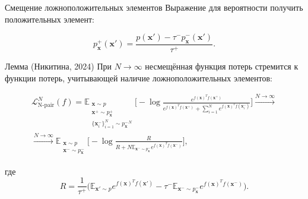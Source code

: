 \documentclass{beamer}
\begin{document}
\begin{frame}{Смещение ложноположительных элементов}
\small
Выражение для вероятности получить положительных элемент:

\[p_\mathbf{x}^+ (\textbf{x}') = \frac{p(\textbf{x}') - \tau^- p^-_\mathbf{x}(\textbf{x}')}{\tau^+}.\]

\begin{block}{Лемма (Никитина, 2024)}
При $N \to \infty$ несмещённая функция потерь стремится к функции потерь, учитывающей наличие ложноположительных элементов:
\end{block}
\begin{equation*}
\begin{split}
\mathcal{L}_{\text{N-pair}}^N(f) = \mathbb{E}_{\substack{\mathbf{x} \sim p \\ \mathbf{x}^+ \sim p_\mathbf{x}^+ \\ \{\mathbf{x}_i^-\}_{i=1}^N \sim {p_\mathbf{x}^-}^N}} \bigg[ - \log \frac{e^{f(\mathbf{x})^T f(\mathbf{x}^+)}}{e^{f(\mathbf{x})^T f(\mathbf{x}^+)} + \sum_{i=1}^N e^{f(\mathbf{x})^T f(\mathbf{x}_i^-)}} \bigg] \overset{N \to \infty}{\longrightarrow} \\
\overset{N \to \infty}{\longrightarrow} \mathbb{E}_{\substack{\mathbf{x} \sim p \\ \mathbf{x}^- \sim p_\mathbf{x}^-}} \bigg[ - \log \frac{R}{R + N \mathbb{E}_{\mathbf{x}^- \sim p_\mathbf{x}^-} e^{f(\mathbf{x})^T f(\mathbf{x}^-)}} \bigg],
\end{split}
\end{equation*}

\noindent где
\[R = \frac{1}{\tau^+} \big(\mathbb{E}_{\mathbf{x}' \sim p} e^{f(\mathbf{x})^T f(\mathbf{x}')} - \tau^- \mathbb{E}_{\mathbf{x}^- \sim p_\mathbf{x}^-} e^{f(\mathbf{x})^T f(\mathbf{x}^-)}\big).\]
\end{frame}
\end{document}
